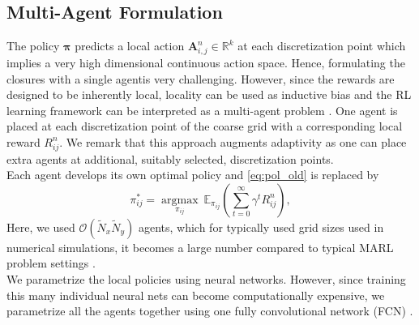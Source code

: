 \documentclass{article}
\theoremstyle{plain}
\theoremstyle{definition}
\theoremstyle{remark}
\begin{document}
\subsection{Multi-Agent Formulation} 
\label{sec:marl}
The policy $\boldsymbol{\pi}$ predicts a local action $ \boldsymbol{A}^n_{i,j} \in \mathbb R^k$ at each discretization point which implies a very high dimensional  continuous action space. Hence, formulating the closures  with a single agentis very challenging. However, since the rewards are designed to be inherently local, locality can be used as inductive bias and the RL learning framework can be interpreted as a multi-agent problem \cite{cv_pixel_rl}. One agent is placed at each discretization point of the coarse grid with a  corresponding local reward $R_{ij}^n$. We remark  that this approach augments adaptivity as  one can place extra agents at additional, suitably selected, discretization points.\\
Each agent develops its own optimal policy and \cref{eq:pol_old} is replaced by 
\begin{equation} \label{eq:CNN-MARL_objective}
\pi_{ij}^*=\underset{\pi_{ij}}{\operatorname{argmax}} \ \mathbb E_{\pi_{ij}}\left(\sum_{t=0}^{\infty} \gamma^t  R_{ij}^{n}\right),
\end{equation}
Here, we used $\mathcal O (\tilde N_x \tilde N_y)$ agents, which for typically used  grid sizes used in  numerical simulations, it becomes a large number compared to typical MARL problem settings \cite{albrecht2023multi}.\\
We parametrize the local policies using neural networks. However, since training this many individual neural nets can become  computationally expensive, we parametrize all the agents together using  one fully convolutional network (FCN) \cite{fcn}.
\end{document}

